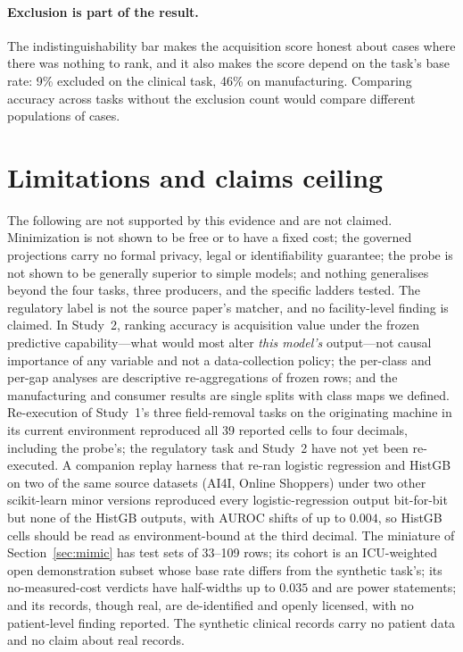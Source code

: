 \documentclass[11pt]{article}
\begin{document}
\paragraph{Exclusion is part of the result.} The indistinguishability bar makes the acquisition score honest about cases where there was nothing to rank, and it also makes the score depend on the task's base rate: 9\% excluded on the clinical task, 46\% on manufacturing. Comparing accuracy across tasks without the exclusion count would compare different populations of cases.

\section{Limitations and claims ceiling}
\label{sec:limits}

The following are not supported by this evidence and are not claimed. Minimization is not shown to be free or to have a fixed cost; the governed projections carry no formal privacy, legal or identifiability guarantee; the probe is not shown to be generally superior to simple models; and nothing generalises beyond the four tasks, three producers, and the specific ladders tested. The regulatory label is not the source paper's matcher, and no facility-level finding is claimed. In Study~2, ranking accuracy is acquisition value under the frozen predictive capability---what would most alter \emph{this model's} output---not causal importance of any variable and not a data-collection policy; the per-class and per-gap analyses are descriptive re-aggregations of frozen rows; and the manufacturing and consumer results are single splits with class maps we defined. Re-execution of Study~1's three field-removal tasks on the originating machine in its current environment reproduced all 39 reported cells to four decimals, including the probe's; the regulatory task and Study~2 have not yet been re-executed. A companion replay harness that re-ran logistic regression and HistGB on two of the same source datasets (AI4I, Online Shoppers) under two other scikit-learn minor versions reproduced every logistic-regression output bit-for-bit but none of the HistGB outputs, with AUROC shifts of up to $0.004$, so HistGB cells should be read as environment-bound at the third decimal. The miniature of Section~\ref{sec:mimic} has test sets of 33--109 rows; its cohort is an ICU-weighted open demonstration subset whose base rate differs from the synthetic task's; its no-measured-cost verdicts have half-widths up to $0.035$ and are power statements; and its records, though real, are de-identified and openly licensed, with no patient-level finding reported. The synthetic clinical records carry no patient data and no claim about real records.
\end{document}
